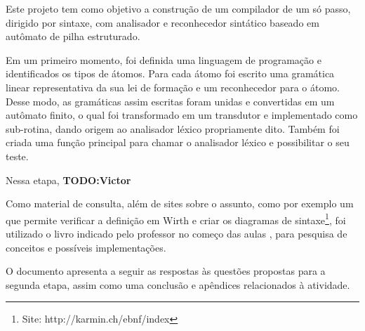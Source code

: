 
Este projeto tem como objetivo a construção de um compilador de um só passo, dirigido por sintaxe, com analisador e reconhecedor sintático baseado em autômato de pilha estruturado.

Em um primeiro momento, foi definida uma linguagem de programação e identificados os tipos de átomos. Para cada átomo foi escrito uma gramática linear representativa da sua lei de formação e um reconhecedor para o átomo. Desse modo, as gramáticas assim escritas foram unidas e convertidas em um autômato finito, o qual foi transformado em um transdutor e implementado como sub-rotina, dando origem ao analisador léxico propriamente dito. Também foi criada uma função principal para chamar o analisador léxico e possibilitar o seu teste.

Nessa etapa, \textbf{TODO:Victor}

Como material de consulta, além de sites sobre o assunto, como por exemplo um que permite verificar a definição em Wirth e criar os diagramas de sintaxe\footnote{Site: http://karmin.ch/ebnf/index}, foi utilizado o livro indicado pelo professor no começo das aulas \cite{intro-compiladores}, para pesquisa de conceitos e possíveis implementações.

O documento apresenta a seguir as respostas às questões propostas para a segunda etapa, assim como uma conclusão e apêndices relacionados à atividade.

